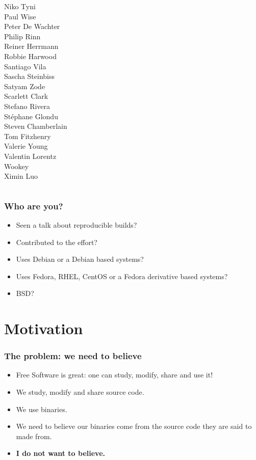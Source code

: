 \documentclass[14pt]{beamer}
\newif\ifplacelogo
\begin{document}
\begin{frame}
\begin{center}
\begin{columns}
    Niko Tyni \\
    {Paul Wise} \\
    Peter De Wachter \\
    Philip Rinn \\
    {Reiner Herrmann} \\
    Robbie Harwood \\
    {Santiago Vila} \\
    {Sascha Steinbiss} \\
    {Satyam Zode} \\
    {Scarlett Clark} \\
    {Stefano Rivera} \\
    {Stéphane Glondu} \\
    {Steven Chamberlain} \\
    Tom Fitzhenry \\
    {Valerie Young} \\
    Valentin Lorentz \\
    {Wookey} \\
    {Ximin Luo} \\
  \end{columns}
 \end{center}
\end{frame}


\placelogofalse

\begin{frame}
 \frametitle{Who are you?}
 \begin{itemize}
  \item<2-6> Seen a talk about reproducible builds?
  \item<3-6> Contributed to the effort?
  \item<4-6> Uses Debian or a Debian based systems?
  \item<5-6> Uses Fedora, RHEL, CentOS or a Fedora derivative based systems?
  \item<6> BSD?
 \end{itemize}
\end{frame}



\section{Motivation}

\begin{frame}[fragile]
 \frametitle{The problem: we need to believe}
 \begin{itemize}
  \item Free Software is great: one can study, modify, share and use it!
  \item<2-4> We study, modify and share source code.
  \item<2-4> We use binaries.
  \item<3-4> We need to believe our binaries come from the source code they are said to made from.
  \item<4> \textbf{I do not want to believe.}
 
 \end{itemize}
\end{frame}
\end{document}
